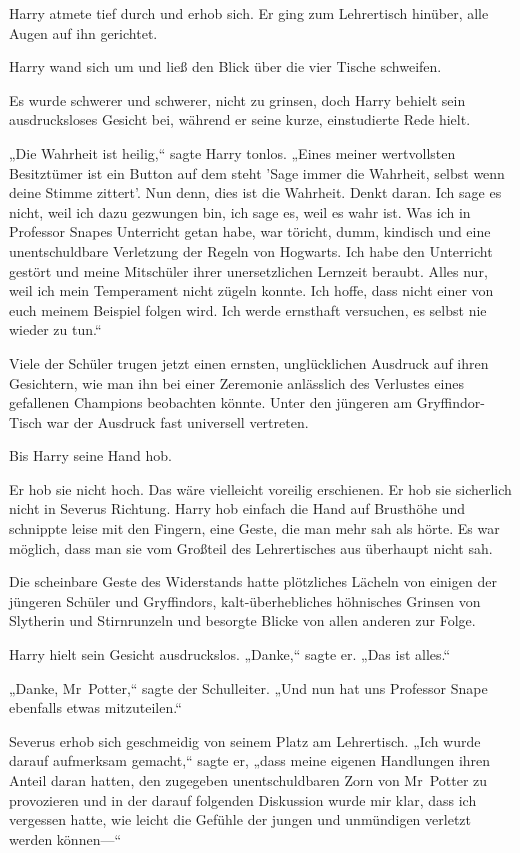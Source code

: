 {Harry atmete tief durch und erhob sich. Er ging zum Lehrertisch hinüber, alle Augen auf ihn gerichtet.

Harry wand sich um und ließ den Blick über die vier Tische schweifen.

Es wurde schwerer und schwerer, nicht zu grinsen, doch Harry behielt sein ausdrucksloses Gesicht bei, während er seine kurze, einstudierte Rede hielt.

„Die Wahrheit ist heilig,“ sagte Harry tonlos. „Eines meiner wertvollsten Besitztümer ist ein Button auf dem steht 'Sage immer die Wahrheit, selbst wenn deine Stimme zittert'. Nun denn, dies ist die Wahrheit. Denkt daran. Ich sage es nicht, weil ich dazu gezwungen bin, ich sage es, weil es wahr ist. Was ich in Professor Snapes Unterricht getan habe, war töricht, dumm, kindisch und eine unentschuldbare Verletzung der Regeln von Hogwarts. Ich habe den Unterricht gestört und meine Mitschüler ihrer unersetzlichen Lernzeit beraubt. Alles nur, weil ich mein Temperament nicht zügeln konnte. Ich hoffe, dass nicht einer von euch meinem Beispiel folgen wird. Ich werde ernsthaft versuchen, es selbst nie wieder zu tun.“

Viele der Schüler trugen jetzt einen ernsten, unglücklichen Ausdruck auf ihren Gesichtern, wie man ihn bei einer Zeremonie anlässlich des Verlustes eines gefallenen Champions beobachten könnte. Unter den jüngeren am Gryffindor-Tisch war der Ausdruck fast universell vertreten.

Bis Harry seine Hand hob.

Er hob sie nicht hoch. Das wäre vielleicht voreilig erschienen. Er hob sie sicherlich nicht in Severus Richtung. Harry hob einfach die Hand auf Brusthöhe und schnippte leise mit den Fingern, eine Geste, die man mehr sah als hörte. Es war möglich, dass man sie vom Großteil des Lehrertisches aus überhaupt nicht sah.

Die scheinbare Geste des Widerstands hatte plötzliches Lächeln von einigen der jüngeren Schüler und Gryffindors, kalt-überhebliches höhnisches Grinsen von Slytherin und Stirnrunzeln und besorgte Blicke von allen anderen zur Folge.

Harry hielt sein Gesicht ausdruckslos. „Danke,“ sagte er. „Das ist alles.“

„Danke, Mr~Potter,“ sagte der Schulleiter. „Und nun hat uns Professor Snape ebenfalls etwas mitzuteilen.“

Severus erhob sich geschmeidig von seinem Platz am Lehrertisch. „Ich wurde darauf aufmerksam gemacht,“ sagte er, „dass meine eigenen Handlungen ihren Anteil daran hatten, den zugegeben unentschuldbaren Zorn von Mr~Potter zu provozieren und in der darauf folgenden Diskussion wurde mir klar, dass ich vergessen hatte, wie leicht die Gefühle der jungen und unmündigen verletzt werden können—“

}
